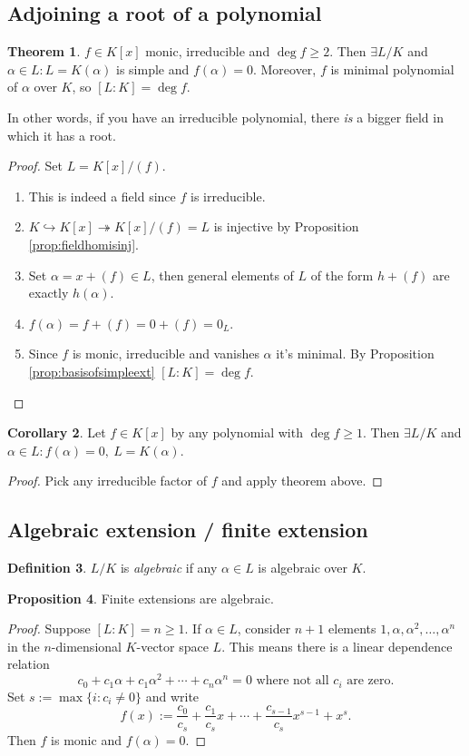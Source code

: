 \documentclass[a4paper]{article}
\theoremstyle{definition}
\newtheorem{defn}{Definition}[subsection]
\newtheorem{prop}[defn]{Proposition}
\newtheorem{thm}[defn]{Theorem}
\newtheorem{coro}[defn]{Corollary}
\begin{document}
\subsection{Adjoining a root of a polynomial}
\begin{thm}
$f\in K[x]$ monic, irreducible and $\deg f\geq 2$. Then $\exists L/K$ and $\alpha\in L:L=K(\alpha)$ is simple and $f(\alpha)=0.$ Moreover, $f$ is minimal polynomial of $\alpha$ over $K$, so $[L:K]=\deg f$.

In other words, if you have an irreducible polynomial, there \textit{is} a bigger field in which it has a root.
\end{thm}
\begin{proof}
Set $L=K[x]/(f)$.
\begin{enumerate}
\item This is indeed a field since $f$ is irreducible.
\item $K\hookrightarrow K[x] \twoheadrightarrow K[x]/(f)=L$ is injective by Proposition \ref{prop:fieldhomisinj}.
\item Set $\alpha=x+(f) \in L$, then general elements of $L$ of the form $h+(f)$ are exactly $h(\alpha)$.
\item $f(\alpha)=f+(f)=0+(f)=0_L$.
\item Since $f$ is monic, irreducible and vanishes $\alpha$ it's minimal. By Proposition \ref{prop:basisofsimpleext} $[L:K]=\deg f$.
\end{enumerate}
\end{proof}

\begin{coro}
Let $f\in K[x]$ by any polynomial with $\deg f\geq 1$. Then $\exists L/K$ and $\alpha\in L:f(\alpha)=0,\ L=K(\alpha)$.
\end{coro}
\begin{proof}
Pick any irreducible factor of $f$ and apply theorem above.
\end{proof}

\subsection{Algebraic extension / finite extension}
\begin{defn}
$L/K$ is \textit{algebraic} if any $\alpha\in L$ is algebraic over $K$.
\end{defn}

\begin{prop}
Finite extensions are algebraic.
\end{prop}
\begin{proof}
Suppose $[L:K]=n\geq 1$. If $\alpha\in L$, consider $n+1$ elements $1,\alpha,\alpha^2,\ldots,\alpha^n$ in the $n$-dimensional $K$-vector space $L$. This means there is a linear dependence relation
\[
c_0+c_1\alpha+c_1\alpha^2+\cdots+c_n \alpha^n=0\text{ where not all }c_i\text{ are zero}.
\]
Set $s:=\max\{i:c_i\neq 0\}$ and write
\[
f(x):=\frac{c_0}{c_s}+\frac{c_1}{c_s}x+\cdots+\frac{c_{s-1}}{c_s}x^{s-1}+x^s.
\]
Then $f$ is monic and $f(\alpha)=0.$
\end{proof}
\end{document}
